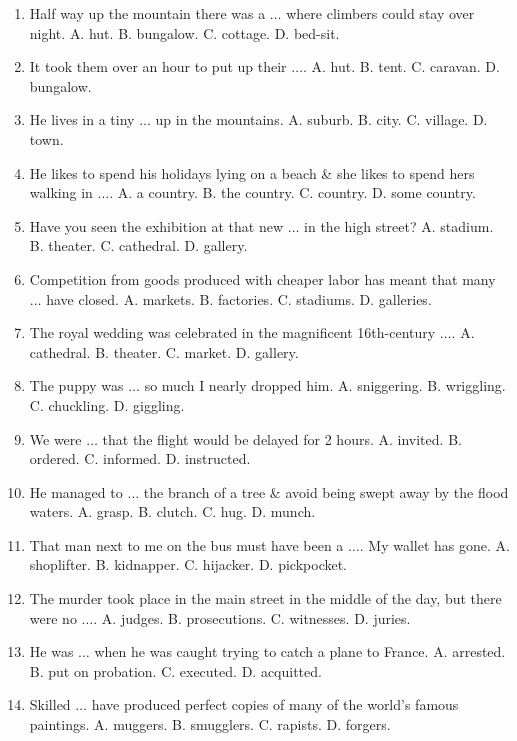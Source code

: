 \documentclass{article}
\numberwithin{equation}{section}
\begin{document}
\begin{enumerate}[leftmargin=8mm]
	\item Half way up the mountain there was a $\ldots$ where climbers could stay over night. {\sf A.} hut. {\sf B.} bungalow. {\sf C.} cottage. {\sf D.} bed-sit.
	\item It took them over an hour to put up their $\ldots$. {\sf A.} hut. {\sf B.} tent. {\sf C.} caravan. {\sf D.} bungalow.
	\item He lives in a tiny $\ldots$ up in the mountains. {\sf A.} suburb. {\sf B.} city. {\sf C.} village. {\sf D.} town.
	\item He likes to spend his holidays lying on a beach \& she likes to spend hers walking in $\ldots$. {\sf A.} a country. {\sf B.} the country. {\sf C.} country. {\sf D.} some country.
	\item Have you seen the exhibition at that new $\ldots$ in the high street? {\sf A.} stadium. {\sf B.} theater. {\sf C.} cathedral. {\sf D.} gallery.
	\item Competition from goods produced with cheaper labor has meant that many $\ldots$ have closed. {\sf A.} markets. {\sf B.} factories. {\sf C.} stadiums. {\sf D.} galleries.
	\item The royal wedding was celebrated in the magnificent 16th-century $\ldots$. {\sf A.} cathedral. {\sf B.} theater. {\sf C.} market. {\sf D.} gallery.
	\item The puppy was $\ldots$ so much I nearly dropped him. {\sf A.} sniggering. {\sf B.} wriggling. {\sf C.} chuckling. {\sf D.} giggling.
	\item We were $\ldots$ that the flight would be delayed for 2 hours. {\sf A.} invited. {\sf B.} ordered. {\sf C.} informed. {\sf D.} instructed.
	\item He managed to $\ldots$ the branch of a tree \& avoid being swept away by the flood waters. {\sf A.} grasp. {\sf B.} clutch. {\sf C.} hug. {\sf D.} munch.
	\item That man next to me on the bus must have been a $\ldots$. My wallet has gone. {\sf A.} shoplifter. {\sf B.} kidnapper. {\sf C.} hijacker. {\sf D.} pickpocket.
	\item The murder took place in the main street in the middle of the day, but there were no $\ldots$. {\sf A.} judges. {\sf B.} prosecutions. {\sf C.} witnesses. {\sf D.} juries.
	\item He was $\ldots$ when he was caught trying to catch a plane to France. {\sf A.} arrested. {\sf B.} put on probation. {\sf C.} executed. {\sf D.} acquitted.
	\item Skilled $\ldots$ have produced perfect copies of many of the world's famous paintings. {\sf A.} muggers. {\sf B.} smugglers. {\sf C.} rapists. {\sf D.} forgers.

\end{enumerate}
\end{document}

